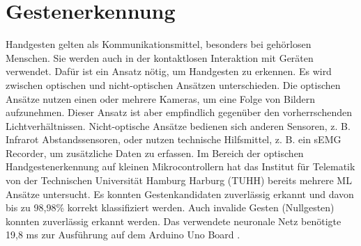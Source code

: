 \chapter{Gestenerkennung}
Handgesten gelten als Kommunikationsmittel, besonders bei gehörlosen Menschen. Sie werden auch in der kontaktlosen Interaktion mit Geräten verwendet. Dafür ist ein Ansatz nötig, um Handgesten
zu erkennen. Es wird zwischen optischen und nicht-optischen Ansätzen unterschieden. Die optischen Ansätze nutzen einen
oder mehrere Kameras, um eine Folge von Bildern aufzunehmen. Dieser Ansatz ist aber empfindlich gegenüber den vorherrschenden Lichtverhältnissen.
Nicht-optische Ansätze bedienen sich anderen Sensoren, z. B. Infrarot Abstandssensoren, oder nutzen technische Hilfsmittel, z. B. ein sEMG Recorder, um zusätzliche Daten zu erfassen.
\newline
\newline
Im Bereich der optischen Handgestenerkennung auf kleinen Mikrocontrollern hat das Institut für Telematik von der Technischen Universität Hamburg Harburg (TUHH) bereits mehrere ML Ansätze untersucht.
Es konnten Gestenkandidaten zuverlässig erkannt und davon bis zu 98,98\% korrekt klassifiziert werden. Auch invalide Gesten (Nullgesten) konnten zuverlässig erkannt werden. Das verwendete neuronale Netz
benötigte 19,8 ms zur Ausführung auf dem Arduino Uno Board \cite{gieseThesis}.


